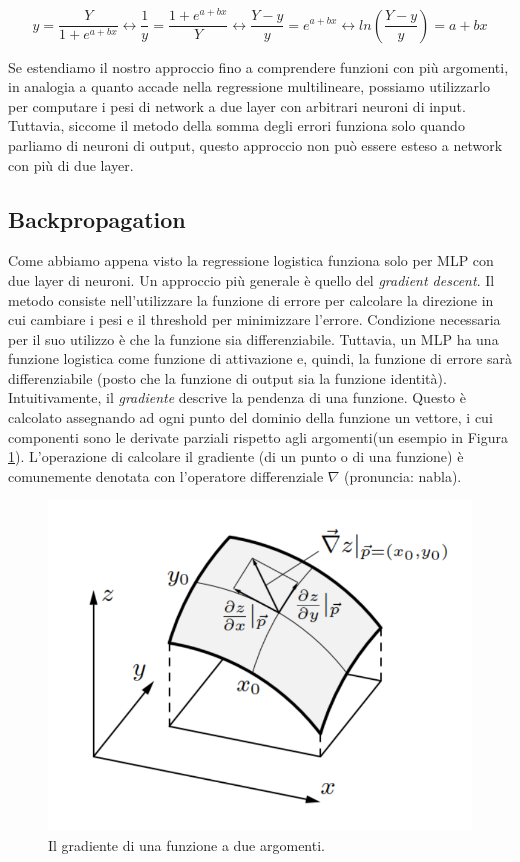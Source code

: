 \documentclass[10pt,a4paper]{article}
\begin{document}
$$
y = \frac{Y}{1 + e^{a+bx}} \leftrightarrow \frac{1}{y} = \frac{1 + e^{a+bx}}{Y} \leftrightarrow \frac{Y - y}{y} = e^{a+bx} \leftrightarrow ln(\frac{Y - y}{y}) = a+bx
$$

Se estendiamo il nostro approccio fino a comprendere funzioni con più argomenti, in analogia a quanto accade nella regressione multilineare, possiamo utilizzarlo per computare i pesi di network a due layer con arbitrari neuroni di input. Tuttavia, siccome il metodo della somma degli errori funziona solo quando parliamo di neuroni di output, questo approccio non può essere esteso a network con più di due layer.

\subsection{Backpropagation}

Come abbiamo appena visto la regressione logistica funziona solo per MLP con due layer di neuroni. Un approccio più generale è quello del \emph{gradient descent}. Il metodo consiste nell'utilizzare la funzione di errore per calcolare la direzione in cui cambiare i pesi e il threshold per minimizzare l'errore. Condizione necessaria per il suo utilizzo è che la funzione sia differenziabile. Tuttavia, un MLP ha una funzione logistica come funzione di attivazione e, quindi, la funzione di errore sarà differenziabile (posto che la funzione di output sia la funzione identità).
Intuitivamente, il \emph{gradiente} descrive la pendenza di una funzione. Questo è calcolato assegnando ad ogni punto del dominio della funzione un vettore, i cui componenti sono le derivate parziali rispetto agli argomenti(un esempio in Figura \ref{fig:13}). L'operazione di calcolare il gradiente (di un punto o di una funzione) è comunemente denotata con l'operatore differenziale $\nabla$ (pronuncia: nabla).

\begin{figure}
\centering
\includegraphics[scale=0.3]{img/gradient.png}
\caption{Il gradiente di una funzione a due argomenti.}
\label{fig:13}
\end{figure}
\end{document}
